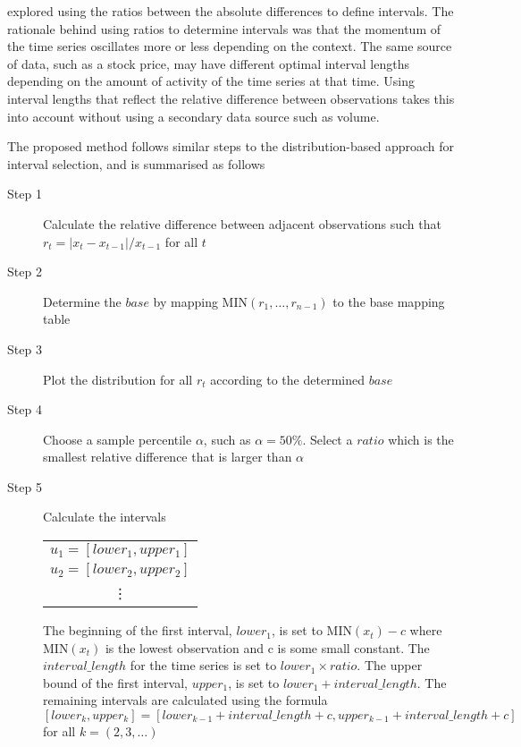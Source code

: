 \documentclass{article}
\theoremstyle{definition}
\begin{document}
\cite{huarng2006ratio} explored using the ratios between the absolute differences to define intervals. The rationale behind using ratios to determine intervals was that the momentum of the time series oscillates more or less depending on the context. The same source of data, such as a stock price, may have different optimal interval lengths depending on the amount of activity of the time series at that time. Using interval lengths that reflect the relative difference between observations takes this into account without using a secondary data source such as volume.

The proposed method follows similar steps to the distribution-based approach for interval selection, and is summarised as follows

\begin{description}
\item[Step 1] Calculate the relative difference between adjacent observations such that $r_t=|x_t-x_{t-1}|/x_{t-1}$ for all $t$
\item[Step 2] Determine the $base$ by mapping MIN$(r_1,\ldots,r_{n-1})$ to the base mapping table
\item[Step 3] Plot the distribution for all $r_t$ according to the determined $base$
\item[Step 4] Choose a sample percentile $\alpha$, such as $\alpha=50\%$. Select a $ratio$ which is the smallest relative difference that is larger than $\alpha$
\item[Step 5] Calculate the intervals 

\begin{table}[H]
	\center
	\begin{tabular}{ c }
	  	$u_1 = [lower_1, upper_1]$ \\
	  	$u_2 = [lower_2, upper_2]$ \\
	  	\vdots \\
	\end{tabular}
\end{table}

The beginning of the first interval, $lower_1$, is set to MIN$(x_t)-c$ where MIN$(x_t)$ is the lowest observation and c is some small constant. The $interval\_length$ for the time series is set to $lower_1 \times ratio$. The upper bound of the first interval, $upper_1$, is set to $lower_1 + interval\_length$. The remaining intervals are calculated using the formula $[lower_k,upper_k]=[lower_{k-1}+interval\_length+c, upper_{k-1}+interval\_length+c]$ for all $k=(2,3,\ldots)$
\end{description}
\end{document}
